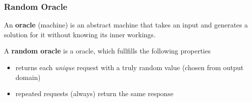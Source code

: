 \begin{frame}
	\frametitle{Random Oracle}

	\begin{definition}[Oracle]
		An \textbf{oracle} (machine) is an abstract machine that takes an input and generates a solution for it without knowing its inner workings.
	\end{definition}
	\begin{definition}
		A \textbf{random oracle} is a oracle, which fullfills the following properties
		\begin{itemize}
			\item returns each \textit{unique} request with a truly random value (chosen from output domain)
			\item repeated requests (always) return the same response
		\end{itemize}
	\end{definition}
\end{frame}